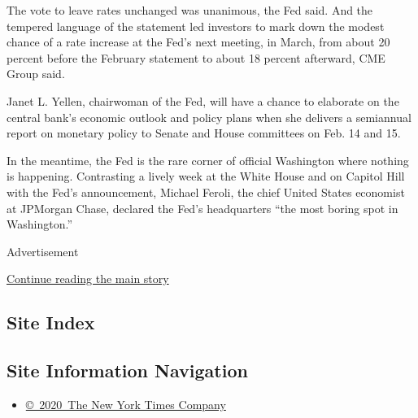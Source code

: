 The vote to leave rates unchanged was unanimous, the Fed said. And the
tempered language of the statement led investors to mark down the modest
chance of a rate increase at the Fed's next meeting, in March, from
about 20 percent before the February statement to about 18 percent
afterward, CME Group said.

Janet L. Yellen, chairwoman of the Fed, will have a chance to elaborate
on the central bank's economic outlook and policy plans when she
delivers a semiannual report on monetary policy to Senate and House
committees on Feb. 14 and 15.

In the meantime, the Fed is the rare corner of official Washington where
nothing is happening. Contrasting a lively week at the White House and
on Capitol Hill with the Fed's announcement, Michael Feroli, the chief
United States economist at JPMorgan Chase, declared the Fed's
headquarters ``the most boring spot in Washington.''

Advertisement

\protect\hyperlink{after-bottom}{Continue reading the main story}

\hypertarget{site-index}{%
\subsection{Site Index}\label{site-index}}

\hypertarget{site-information-navigation}{%
\subsection{Site Information
Navigation}\label{site-information-navigation}}

\begin{itemize}
\tightlist
\item
  \href{https://help.nytimes.com/hc/en-us/articles/115014792127-Copyright-notice}{©~2020~The
  New York Times Company}
\end{itemize}

